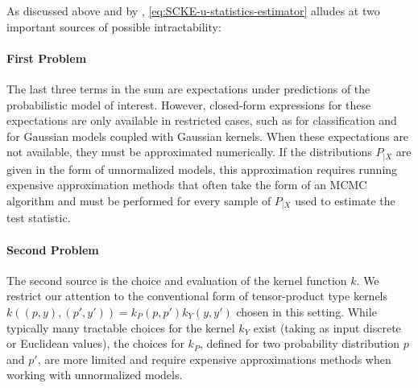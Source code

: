 \documentclass{uai2023} %
\begin{document}
As discussed above and by \citet{widmann2022calibration}, \cref{eq:SCKE-u-statistics-estimator} alludes at two important sources of possible intractability:

\paragraph{First Problem}
The last three terms in the sum are expectations under predictions of the probabilistic model of interest.
However, closed-form expressions for these expectations are only available in restricted cases, such as for classification and for Gaussian models coupled with Gaussian kernels.
When these expectations are not available, they must be approximated numerically.
If the distributions $P_{|X}$ are given in the form of unnormalized models, this approximation requires running expensive approximation methods that often take the form of an MCMC algorithm and must be performed for every sample of $P_{|X}$ used to estimate the test statistic.

\paragraph{Second Problem}
The second source is the choice and evaluation of the kernel function $k$.
We restrict our attention to the conventional form of tensor-product type kernels $k((p, y), (p', y')) = k_{P}(p, p') k_{Y}(y, y')$ chosen in this setting.
While typically many tractable choices for the kernel $k_{Y}$ exist (taking as input discrete or Euclidean values), the choices for $k_{P}$, defined for two probability distribution $p$ and $p'$, are more limited and require expensive approximations methods when working with unnormalized models.
\end{document}
